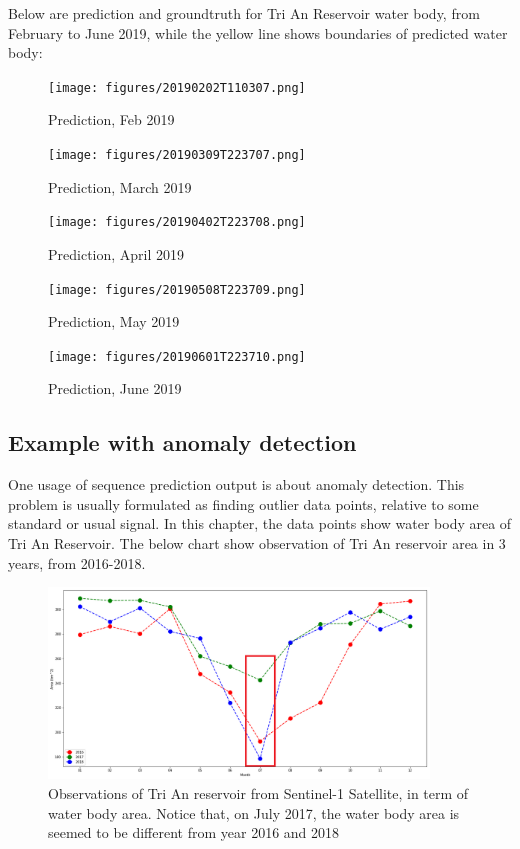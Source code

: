 Below are prediction and groundtruth for Tri An Reservoir water body, from February to June 2019, while the yellow line shows boundaries of predicted water body:

\begin{figure}[h!]
	\centering
	\texttt{[image: figures/20190202T110307.png]}
	\caption{Prediction, Feb 2019}
\end{figure}

\begin{figure}[h!]
	\centering
	\texttt{[image: figures/20190309T223707.png]}
	\caption{Prediction, March 2019}
\end{figure}

\begin{figure}[h!]
	\centering
	\texttt{[image: figures/20190402T223708.png]}
	\caption{Prediction, April 2019}
\end{figure}

\begin{figure}[h!]
	\centering
	\texttt{[image: figures/20190508T223709.png]}
	\caption{Prediction, May 2019}
\end{figure}

\begin{figure}[h!]
	\centering
	\texttt{[image: figures/20190601T223710.png]}
	\caption{Prediction, June 2019}
\end{figure}


\subsection{Example with anomaly detection}
\label{section:anomalyDetection}

One usage of sequence prediction output is about anomaly detection. This problem is usually formulated as finding outlier data points, relative to some standard or usual signal. In this chapter, the data points show water body area of Tri An Reservoir. The below chart show observation of Tri An reservoir area in 3 years, from 2016-2018.

\begin{figure}[h!]
	\centering
	\includegraphics[width=0.9\textwidth]{figures/observations.png}
	\caption{Observations of Tri An reservoir from Sentinel-1 Satellite, in term of water body area. Notice that, on July 2017, the water body area is seemed to be different from year 2016 and 2018}
	\label{fig:observation}
\end{figure}

